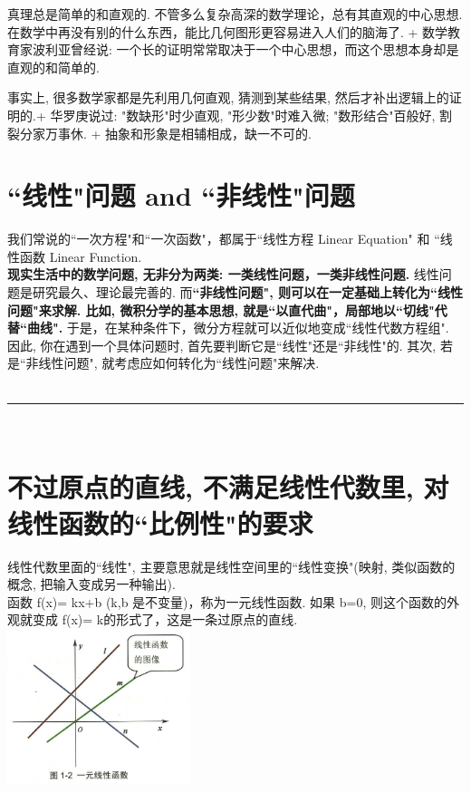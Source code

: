 \documentclass[UTF8]{ctexart}
\begin{document}
真理总是简单的和直观的. 不管多么复杂高深的数学理论，总有其直观的中心思想. 在数学中再没有别的什么东西，能比几何图形更容易进入人们的脑海了.  +
数学教育家波利亚曾经说: 一个长的证明常常取决于一个中心思想，而这个思想本身却是直观的和简单的.

事实上, 很多数学家都是先利用几何直观, 猜测到某些结果, 然后才补出逻辑上的证明的.+ 
华罗庚说过: "数缺形"时少直观, "形少数"时难入微; "数形结合"百般好, 割裂分家万事休. +
抽象和形象是相辅相成，缺一不可的.\\


\section{``线性"问题 and ``非线性"问题}

我们常说的``一次方程"和``一次函数"，都属于``线性方程 Linear Equation" 和 ``线性函数 Linear Function. \\
\textbf{现实生活中的数学问题, 无非分为两类: 一类线性问题，一类非线性问题.} 线性问题是研究最久、理论最完善的. 而\textbf{``非线性问题", 则可以在一定基础上转化为``线性问题"来求解.  比如, 微积分学的基本思想, 就是``以直代曲"，局部地以``切线"代替``曲线".} 于是，在某种条件下，微分方程就可以近似地变成``线性代数方程组".\\

因此, 你在遇到一个具体问题时, 首先要判断它是``线性"还是``非线性"的. 其次, 若是``非线性问题", 就考虑应如何转化为``线性问题"来解决. \\

~\\
\hrule
~\\


\section{不过原点的直线, 不满足线性代数里, 对线性函数的``比例性"的要求}

线性代数里面的``线性", 主要意思就是线性空间里的``线性变换"(映射, 类似函数的概念, 把输入变成另一种输出).\\

函数 f(x)= kx+b (k,b 是不变量)，称为一元线性函数. 如果 b=0, 则这个函数的外观就变成 f(x)= k的形式了，这是一条过原点的直线.\\

\includegraphics[width=0.4\textwidth]{img/0111.png}\\
\end{document}
